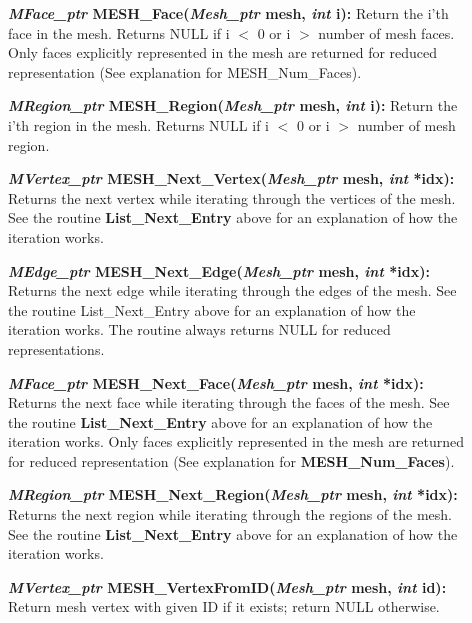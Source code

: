\documentclass[12pt]{article}
\begin{document}
\begin{description}
\item[]\textbf{\textit{MFace\_ptr} MESH\_Face(\textit{Mesh\_ptr} mesh,
\textit{int} i):} Return the i'th face in the mesh. Returns NULL if i $<$
0 or i $>$ number of mesh faces. Only faces explicitly represented in
the mesh are returned for reduced representation (See explanation for
MESH\_Num\_Faces).

\item[]\textbf{\textit{MRegion\_ptr} MESH\_Region(\textit{Mesh\_ptr} mesh,
\textit{int} i):} Return the i'th region in the mesh. Returns NULL if i
$<$ 0 or i $>$ number of mesh region.

\item[]

\item[]\textbf{\textit{MVertex\_ptr} MESH\_Next\_Vertex(\textit{Mesh\_ptr}
mesh, \textit{int} *idx):} Returns the next vertex while iterating
through the vertices of the mesh. See the routine \textbf{List\_Next\_Entry}
above for an explanation of how the iteration works.

\item[]\textbf{\textit{MEdge\_ptr} MESH\_Next\_Edge(\textit{Mesh\_ptr} mesh,
\textit{int} *idx):} Returns the next edge while iterating through the
edges of the mesh. See the routine List\_Next\_Entry above for an
explanation of how the iteration works.  The routine always returns
NULL for reduced representations.

\item[]\textbf{\textit{MFace\_ptr} MESH\_Next\_Face(\textit{Mesh\_ptr} mesh,
\textit{int} *idx):} Returns the next face while iterating through the
faces of the mesh. See the routine \textbf{List\_Next\_Entry} above for
an explanation of how the iteration works.  Only faces explicitly
represented in the mesh are returned for reduced representation (See
explanation for \textbf{MESH\_Num\_Faces}).

\item[]\textbf{\textit{MRegion\_ptr}
    MESH\_Next\_Region(\textit{Mesh\_ptr} mesh, \textit{int} *idx):}
  Returns the next region while iterating through the regions of the
  mesh. See the routine \textbf{List\_Next\_Entry} above for an
  explanation of how the iteration works.
  
\item[]

\item[]\textbf{\textit{MVertex\_ptr}
    MESH\_VertexFromID(\textit{Mesh\_ptr} mesh, \textit{int} id):}
  Return mesh vertex with given ID if it exists; return NULL
  otherwise.
  

\end{description}
\end{document}
